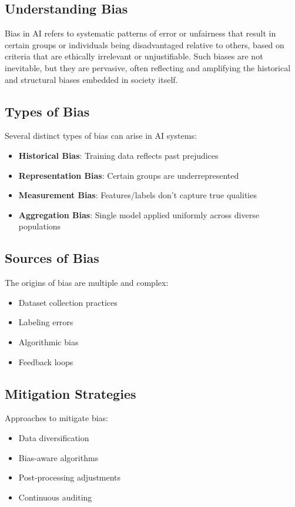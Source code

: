 \documentclass[openany]{book}
\begin{document}
\subsection{Understanding Bias}
Bias in AI refers to systematic patterns of error or unfairness that result in 
certain groups or individuals being disadvantaged relative to others, based on 
criteria that are ethically irrelevant or unjustifiable. Such biases are not 
inevitable, but they are pervasive, often reflecting and amplifying the 
historical and structural biases embedded in society itself.

\subsection{Types of Bias}
Several distinct types of bias can arise in AI systems:

\begin{itemize}
    \item \textbf{Historical Bias}: Training data reflects past prejudices
    \item \textbf{Representation Bias}: Certain groups are underrepresented
    \item \textbf{Measurement Bias}: Features/labels don't capture true 
    qualities
    \item \textbf{Aggregation Bias}: Single model applied uniformly across 
    diverse populations
\end{itemize}

\subsection{Sources of Bias}
The origins of bias are multiple and complex:

\begin{itemize}
    \item Dataset collection practices
    \item Labeling errors
    \item Algorithmic bias
    \item Feedback loops
\end{itemize}

\subsection{Mitigation Strategies}
Approaches to mitigate bias:

\begin{itemize}
    \item Data diversification
    \item Bias-aware algorithms
    \item Post-processing adjustments
    \item Continuous auditing
\end{itemize}
\end{document}
